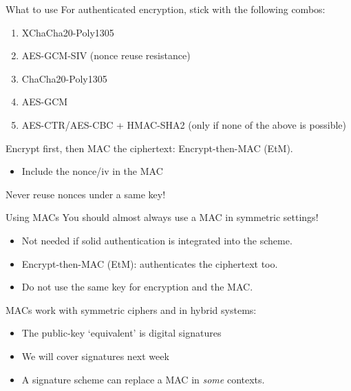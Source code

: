 \begin{frame}{What to use}
  For authenticated encryption, stick with the following combos:
  \begin{enumerate}[<+(1)->]
    \item XChaCha20-Poly1305
    \item AES-GCM-SIV (nonce reuse resistance)
    \item ChaCha20-Poly1305
    \item AES-GCM
    \item AES-CTR/AES-CBC + HMAC-SHA2 (only if none of the above is possible)
  \end{enumerate}

  \vspace*{1em}

  \pause
  Encrypt first, then MAC the ciphertext: Encrypt-then-MAC (EtM).
  \begin{itemize}[<+(1)->]
    \item Include the nonce/iv in the MAC
  \end{itemize}

  \vspace*{1em}

  \pause
  Never reuse nonces under a same key!
\end{frame}

\begin{frame}{Using MACs}
  You should almost always use a MAC in symmetric settings!
  \begin{itemize}[<+(1)->]
    \item Not needed if solid authentication is integrated into the scheme.
    \item Encrypt-then-MAC (EtM): authenticates the ciphertext too.
    \item Do not use the same key for encryption and the MAC.
  \end{itemize}

  \vspace*{1em}

  \pause
  MACs work with symmetric ciphers and in hybrid systems:
  \begin{itemize}[<+(1)->]
    \item The public-key `equivalent' is digital signatures
    \item We will cover signatures next week
    \item A signature scheme can replace a MAC in \emph{some} contexts.
  \end{itemize}
\end{frame}


